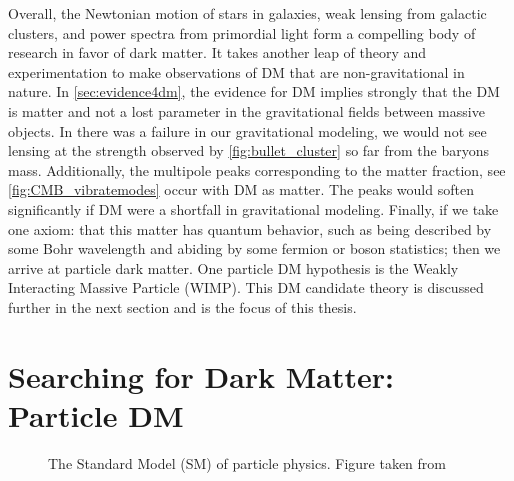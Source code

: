 Overall, the Newtonian motion of stars in galaxies, weak lensing from galactic clusters, and power spectra from primordial light form a compelling body of research in favor of dark matter.
It takes another leap of theory and experimentation to make observations of DM that are non-gravitational in nature.
In \cref{sec:evidence4dm}, the evidence for DM implies strongly that the DM is matter and not a lost parameter in the gravitational fields between massive objects.
In there was a failure in our gravitational modeling, we would not see lensing at the strength observed by \cref{fig:bullet_cluster} \cite{Clowe:BulletCluster} so far from the baryons mass.
Additionally, the multipole peaks corresponding to the matter fraction, see \cref{fig:CMB_vibratemodes} occur with DM as matter.
The peaks would soften significantly if DM were a shortfall in gravitational modeling.
Finally, if we take one axiom: that this matter has quantum behavior, such as being described by some Bohr wavelength and abiding by some fermion or boson statistics; then we arrive at particle dark matter.
One particle DM hypothesis is the Weakly Interacting Massive Particle (WIMP).
This DM candidate theory is discussed further in the next section and is the focus of this thesis.

\section{Searching for Dark Matter: Particle DM}\label{sec:dm_search}

\begin{figure}[h]
    \caption{The Standard Model (SM) of particle physics. Figure taken from \cite{sm_table}}
    \label{fig:SM}
\end{figure}

